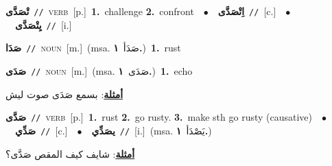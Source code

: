 \documentclass[10pt,a4paper,twoside]{article} %
\begin{document}
\begin{multicols}{2}
{\setlength\topsep{0pt}\textbf{\foreignlanguage{arabic}{تْصَدَّى}}\ {\color{gray}\texttt{//}\color{black}}\ \textsc{verb}\ [p.]\ \textbf{1.}~challenge  \textbf{2.}~confront\ \ $\bullet$\ \ \setlength\topsep{0pt}\textbf{\foreignlanguage{arabic}{اِتْصَدَّى}}\ {\color{gray}\texttt{//}\color{black}}\ [c.]\ \ $\bullet$\ \ \setlength\topsep{0pt}\textbf{\foreignlanguage{arabic}{يِتْصَدَّى}}\ {\color{gray}\texttt{//}\color{black}}\ [i.]\ } \vspace{2mm}

{\setlength\topsep{0pt}\textbf{\foreignlanguage{arabic}{صَدَا}}\ {\color{gray}\texttt{//}\color{black}}\ \textsc{noun}\ [m.]\ \color{gray}(msa. \foreignlanguage{arabic}{صَدَأ}~\foreignlanguage{arabic}{\textbf{١.}})\color{black}\ \textbf{1.}~rust\ } \vspace{2mm}

{\setlength\topsep{0pt}\textbf{\foreignlanguage{arabic}{صَدَى}}\ {\color{gray}\texttt{//}\color{black}}\ \textsc{noun}\ [m.]\ \color{gray}(msa. \foreignlanguage{arabic}{صَدَى}~\foreignlanguage{arabic}{\textbf{١.}})\color{black}\ \textbf{1.}~echo\  \begin{flushright}\color{gray}\foreignlanguage{arabic}{\textbf{\underline{\foreignlanguage{arabic}{أمثلة}}}: بسمع صَدَى صوت ليش}\end{flushright}\color{black}} \vspace{2mm}

{\setlength\topsep{0pt}\textbf{\foreignlanguage{arabic}{صَدَّى}}\ {\color{gray}\texttt{//}\color{black}}\ \textsc{verb}\ [p.]\ \textbf{1.}~rust  \textbf{2.}~go rusty.  \textbf{3.}~make sth go rusty (causative)\ \ $\bullet$\ \ \setlength\topsep{0pt}\textbf{\foreignlanguage{arabic}{صَدِّي}}\ {\color{gray}\texttt{//}\color{black}}\ [c.]\ \ $\bullet$\ \ \setlength\topsep{0pt}\textbf{\foreignlanguage{arabic}{يصَدِّي}}\ {\color{gray}\texttt{//}\color{black}}\ [i.]\ \color{gray}(msa. \foreignlanguage{arabic}{يَصْدَأ}~\foreignlanguage{arabic}{\textbf{١.}})\color{black}\  \begin{flushright}\color{gray}\foreignlanguage{arabic}{\textbf{\underline{\foreignlanguage{arabic}{أمثلة}}}: شايف كيف المقص صَدَّى؟}\end{flushright}\color{black}} \vspace{2mm}


\end{multicols}
\end{document}

